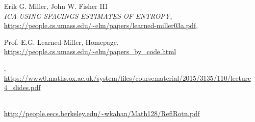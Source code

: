 \documentclass[
10pt,
fleqn,
nosumlimits,
nointlimits,
nonamelimits
]
{article}
\begin{document}
\begin{thebibliography}{4}

Erik G. Miller, John W. Fisher III\\
\textit{ICA USING SPACINGS ESTIMATES OF ENTROPY},\\
\url{https://people.cs.umass.edu/~elm/papers/learned-miller03a.pdf},


 Prof. E.G. Learned-Miller, Homepage,\\ 
\url{https://people.cs.umass.edu/~elm/papers_by_code.html}

,\\
\url{https://www0.maths.ox.ac.uk/system/files/coursematerial/2015/3135/110/lecture4_slides.pdf}

\\
\url{http://people.eecs.berkeley.edu/~wkahan/Math128/ReflRotn.pdf}

\end{thebibliography}
\end{document}
